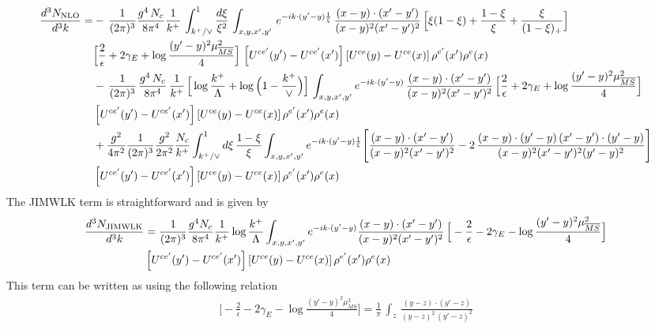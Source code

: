 \documentclass[9pt]{article}
\numberwithin{equation}{section}
\begin{document}
\begin{align}\label{eq:dperp2}
\frac{d^{3}N_{\rm NLO}}{d^{3}k}=&-\,\frac{1}{(2\pi)^{3}}\frac{g^{4}\,N_{c}}{8\pi^{4}}\frac{1}{k^{+}}\,\int_{k^{+}/\vee}^{1}\frac{d\xi}{\xi^{2}}\,\int_{x,y,x',y'}\,e^{-ik\cdot(y'-y)\frac{1}{\xi}}\,\frac{(x-y)\cdot(x'-y')}{(x-y)^{2}(x'-y')^{2}}\,\Big[\xi(1-\xi)+\frac{1-\xi}{\xi}+\frac{\xi}{(1-\xi)_{+}}\Big]\notag \\ & \Big[\frac{2}{\epsilon}+2\gamma_{E}+\log\frac{(y'-y)^{2}\mu^{2}_{\overline{MS}}}{4}\Big]\,\left[U^{ce'}(y')-U^{ce'}(x')\right]\left[U^{ce}(y)-U^{ce}(x)\right]\rho^{e'}(x')\rho^{e}(x)\notag\\&
-\,\frac{1}{(2\pi)^{3}}\,\frac{g^{4}\,N_{c}}{8\pi^{4}}\,\frac{1}{k^{+}}\,\Big[\log\frac{k^{+}}{\Lambda}+\log\Big(1-\frac{k^{+}}{\vee}\Big)\Big]\,\int_{x,y,x',y'}e^{-ik\cdot(y'-y)}\,\frac{(x-y)\cdot(x'-y')}{(x-y)^{2}(x'-y')^{2}}\,\Big[\frac{2}{\epsilon}+2\gamma_{E}+\log\frac{(y'-y)^{2}\mu^{2}_{\overline{MS}}}{4}\Big]\notag \\ & \left[U^{ce'}(y')-U^{ce'}(x')\right]\left[U^{ce}(y)-U^{ce}(x)\right]\rho^{e'}(x')\rho^{e}(x)\notag\\
&+\frac{g^{2}}{4\pi^{2}}\frac{1}{(2\pi)^{3}}\frac{g^{2}}{2\pi^{2}}\frac{N_{c}}{k^{+}}\int_{k^{+}/\vee}^{1}d\xi\,\frac{1-\xi}{\xi}\int_{x,y,x',y'}e^{-ik\cdot(y'-y)\frac{1}{\xi}}\Bigg[\frac{(x-y)\cdot(x'-y')}{(x-y)^{2}(x'-y')^{2}}-2\,\frac{(x-y)\cdot(y'-y)\,(x'-y')\cdot(y'-y)}{(x-y)^{2}(x'-y')^{2}(y'-y)^{2}}\Bigg]\notag \\ & \left[U^{ce'}(y')-U^{ce'}(x')\right]\left[U^{ce}(y)-U^{ce}(x)\right]\rho^{e'}(x')\rho^{e}(x)
\end{align}
The JIMWLK term is straightforward and is given by
\begin{align}\label{eq:jim}
\frac{d^{3}N_{\rm JIMWLK}}{d^{3}k} & = \frac{1}{(2\pi)^{3}}\frac{g^{4}N_{c}}{8\pi^{4}}\frac{1}{k^{+}}\log\frac{k^{+}}{\Lambda}\int_{x,y,x',y'}e^{-ik\cdot(y'-y)}\frac{(x-y)\cdot(x'-y')}{(x-y)^{2}(x'-y')^{2}}\,\Big[-\frac{2}{\epsilon}-2\gamma_{E}-\log\frac{(y'-y)^{2}\mu^{2}_{\overline{MS}}}{4}\Big]\notag \\ & \left[U^{ce'}(y')-U^{ce'}(x')\right]\left[U^{ce}(y)-U^{ce}(x)\right]\rho^{e'}(x')\rho^{e}(x)
\end{align}
This term can be written as using the following relation
\begin{align} \label{eq:div}
\Big[-\frac{2}{\epsilon}-2\gamma_{E}-\log\frac{(y'-y)^{2}\mu^{2}_{\overline{MS}}}{4}\Big] = \frac{1}{\pi}\, \int_{z}\,\frac{(y-z)\cdot (y'-z)}{(y-z)^{2}\,(y'-z)^{2}}
\end{align}
\end{document}
